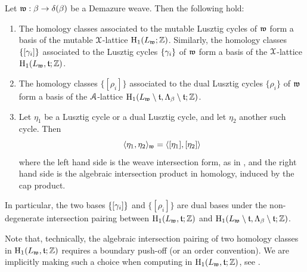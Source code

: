 \begin{lemma}\label{lem:lustzig_cycles_basis}
Let $\mathfrak{w}:\beta\to\delta(\beta)$ be a Demazure weave. Then the following hold:

\begin{enumerate}[label=$(\roman*)$]
    \item The homology classes associated to the mutable Lusztig cycles of $\mathfrak{w}$ form a basis of the mutable $\mathcal{X}$-lattice $\operatorname{H}_1(L_{\mathfrak{w}};\mathbb{Z})$. Similarly, the homology classes $\{[\gamma_i]\}$ associated to the Lusztig cycles $\{\gamma_i\}$ of $\mathfrak{w}$ form a basis of the $\mathcal{X}$-lattice $\operatorname{H}_1(L_{\mathfrak{w}},\mathfrak{t};\mathbb{Z})$.\\

    \item The homology classes $\{[\rho_i]\}$  associated to the dual Lusztig cycles $\{\rho_i\}$ of $\mathfrak{w}$ form a basis of the $\mathcal{A}$-lattice $\operatorname{H}_1(L_{\mathfrak{w}}\setminus \mathfrak{t},\Lambda_\beta\setminus\mathfrak{t};\mathbb{Z})$.\\

    \item Let $\eta_1$ be a Lusztig cycle or a dual Lusztig cycle, and let $\eta_2$ another such cycle. Then
    $$\langle \eta_1,\eta_2\rangle_{\mathfrak{w}}=\langle[\eta_1],[\eta_2]\rangle$$
    where the left hand side is the weave intersection form, as in , and the right hand side is the algebraic intersection product in homology, induced by the cap product.\\
\end{enumerate}
\noindent In particular, the two bases $\{[\gamma_i]\}$  and $\{[\rho_i]\}$ are dual bases under the non-degenerate intersection pairing between $\operatorname{H}_1(L_{\mathfrak{w}},\mathfrak{t};\mathbb{Z})$ and $\operatorname{H}_1(L_{\mathfrak{w}}\setminus \mathfrak{t},\Lambda_\beta\setminus\mathfrak{t};\mathbb{Z})$.\sbs
\end{lemma}

\noindent Note that, technically, the algebraic intersection pairing of two homology classes in $\operatorname{H}_1(L_{\mathfrak{w}},\mathfrak{t};\mathbb{Z})$ requires a boundary push-off (or an order convention). We are implicitly making such a choice when computing in $\operatorname{H}_1(L_{\mathfrak{w}},\mathfrak{t};\mathbb{Z})$, see \cite[Section 3.2]{CGGJ24}.

